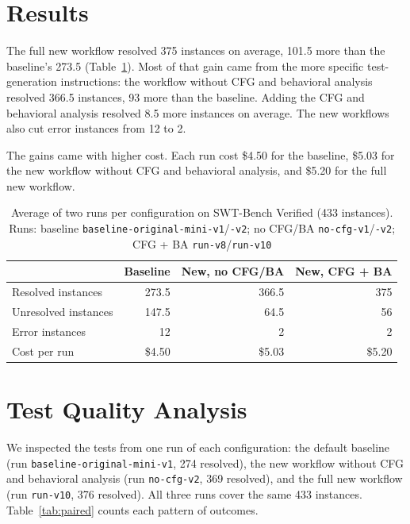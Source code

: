 \documentclass[conference]{IEEEtran}
\begin{document}
\section{Results}
\label{sec:results}
The full new workflow resolved 375 instances on average, 101.5 more than the baseline's 273.5 (Table~\ref{tab:results}). Most of that gain came from the more specific test-generation instructions: the workflow without CFG and behavioral analysis resolved 366.5 instances, 93 more than the baseline. Adding the CFG and behavioral analysis resolved 8.5 more instances on average. The new workflows also cut error instances from 12 to 2.

The gains came with higher cost. Each run cost \$4.50 for the baseline, \$5.03 for the new workflow without CFG and behavioral analysis, and \$5.20 for the full new workflow.

\begin{table}[htbp]
\caption{Average of two runs per configuration on SWT-Bench Verified (433 instances). Runs: baseline \texttt{baseline-original-mini-v1}/\texttt{-v2}; no CFG/BA \texttt{no-cfg-v1}/\texttt{-v2}; CFG + BA \texttt{run-v8}/\texttt{run-v10}}
\label{tab:results}
\centering
\begin{tabular}{@{}lrrr@{}}
\toprule
 & \textbf{Baseline} & \textbf{New, no CFG/BA} & \textbf{New, CFG + BA} \\
\midrule
Resolved instances   & 273.5   & 366.5   & 375     \\
Unresolved instances & 147.5   & 64.5    & 56      \\
Error instances      & 12      & 2       & 2       \\
Cost per run         & \$4.50  & \$5.03  & \$5.20  \\
\bottomrule
\end{tabular}
\end{table}

\section{Test Quality Analysis}
\label{sec:quality}
We inspected the tests from one run of each configuration: the default baseline (run \texttt{baseline-original-mini-v1}, 274 resolved), the new workflow without CFG and behavioral analysis (run \texttt{no-cfg-v2}, 369 resolved), and the full new workflow (run \texttt{run-v10}, 376 resolved). All three runs cover the same 433 instances. Table~\ref{tab:paired} counts each pattern of outcomes.
\end{document}
